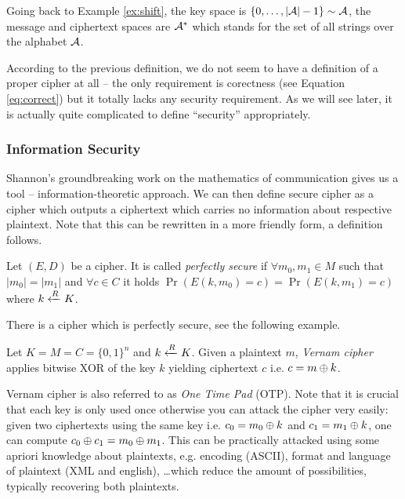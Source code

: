 \begin{note}
	Going back to Example \ref{ex:shift}, the key space is $\{0 , \ldots , |{\cal A}|-1\}\sim\cal A$, the message and ciphertext spaces are ${\cal A}^*$ which stands for the set of all strings over the alphabet $\cal A$.
\end{note}

According to the previous definition, we do not seem to have a definition of a proper cipher at all -- the only requirement is corectness (see Equation \ref{eq:correct}) but it totally lacks any security requirement. As we will see later, it is actually quite complicated to define ``security'' appropriately.

\subsubsection{Information Security}

Shannon's groundbreaking work \cite{shannon1949mathematical} on the mathematics of communication gives us a tool -- information-theoretic approach. We can then define secure cipher as a cipher which outputs a ciphertext which carries no information about respective plaintext. Note that this can be rewritten in a more friendly form, a definition follows.

\begin{defn}
\label{def:perfsec}
	Let $(E,D)$ be a cipher. It is called {\em perfectly secure} if $\forall m_0,m_1\in M$ such that $|m_0| = |m_1|$ and $\forall c\in C$ it holds $\Pr\left(E(k,m_0)=c\right) = \Pr\left(E(k,m_1)=c\right)$ where $k\xleftarrow{R} K$.
\end{defn}

There is a cipher which is perfectly secure, see the following example.

\begin{example}
	Let $K = M = C = \{0,1\}^n$ and $k\xleftarrow{R} K$. Given a plaintext $m$, {\em Vernam cipher} applies bitwise XOR of the key $k$ yielding ciphertext $c$ i.e. $c = m\oplus k$.
\end{example}

\begin{note}
	Vernam cipher is also referred to as {\em One Time Pad} (OTP). Note that it is crucial that each key is only used once otherwise you can attack the cipher very easily: given two ciphertexts using the same key i.e. $c_0=m_0\oplus k$ and $c_1=m_1\oplus k$, one can compute $c_0\oplus c_1 = m_0\oplus m_1$. This can be practically attacked using some apriori knowledge about plaintexts, e.g. encoding (ASCII), format and language of plaintext (XML and english), \ldots which reduce the amount of possibilities, typically recovering both plaintexts.
\end{note}

